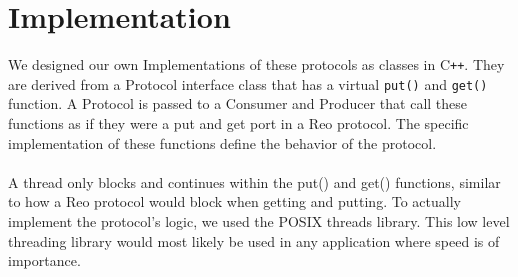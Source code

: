 \section{Implementation}

We designed our own Implementations of these protocols as classes in C\texttt{++}.
They are derived from a Protocol interface class that has a virtual \verb|put()| and \verb|get()| function. A Protocol is passed to a Consumer and Producer that call these functions as if they were a put and get port in a Reo protocol. The specific implementation of these functions define the behavior of the protocol.\\\\
%
A thread only blocks and continues within the put() and get() functions, similar to how a Reo protocol would block when getting and putting.
To actually implement the protocol's logic, we used the POSIX threads library\cite{pthreads}. This low level threading library would most likely be used in any application where speed is of importance.
